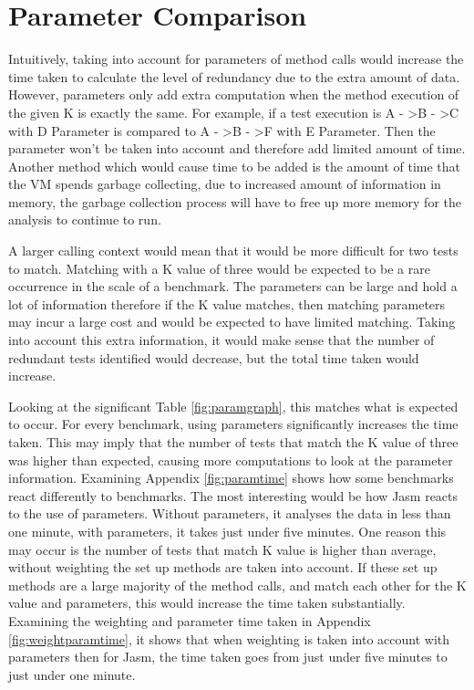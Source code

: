 \section{Parameter Comparison}
\label{sec:param}
Intuitively, taking into account for parameters of method calls would increase the time taken to calculate the level of redundancy due to the extra amount of data. However, parameters only add extra computation when the method execution of the given K is exactly the same. For example, if a test execution is A - \textgreater B - \textgreater C with D Parameter is compared to A - \textgreater B - \textgreater F with E Parameter. Then the parameter won't be taken into account and therefore add limited amount of time. Another method which would cause time to be added is the amount of time that the VM spends garbage collecting, due to increased amount of information in memory, the garbage collection process will have to free up more memory for the analysis to continue to run.

A larger calling context would mean that it would be more difficult for two tests to match. Matching with a K value of three would be expected to be a rare occurrence in the scale of a benchmark. The parameters can be large and hold a lot of information therefore if the K value matches, then matching parameters may incur a large cost and would be expected to have limited matching. Taking into account this extra information, it would make sense that the number of redundant tests identified would decrease, but the total time taken would increase. 

Looking at the significant Table \ref{fig:paramgraph}, this matches what is expected to occur. For every benchmark, using parameters significantly increases the time taken. This may imply that the number of tests that match the K value of three was higher than expected, causing more computations to look at the parameter information. Examining Appendix \ref{fig:paramtime} shows how some benchmarks react differently to benchmarks. The most interesting would be how Jasm reacts to the use of parameters. Without parameters, it analyses the data in less than one minute, with parameters, it takes just under five minutes. One reason this may occur is the number of tests that match K value is higher than average, without weighting the set up methods are taken into account. If these set up methods are a large majority of the method calls, and match each other for the K value and parameters, this would increase the time taken substantially. Examining the weighting and parameter time taken in Appendix \ref{fig:weightparamtime}, it shows that when weighting is taken into account with parameters then for Jasm, the time taken goes from just under five minutes to just under one minute.

